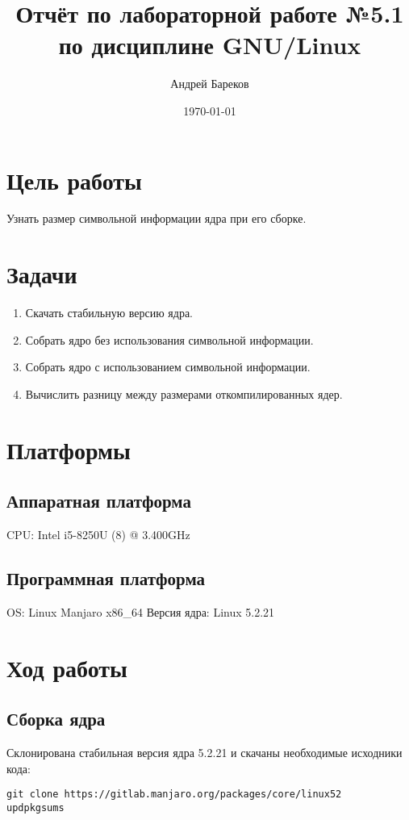 \documentclass[a4paper,11pt]{article}
\title{Отчёт по лабораторной работе №5.1 по дисциплине GNU/Linux}
\author{Андрей Бареков}
\date{\today}
\begin{document}
\maketitle
\newpage

\section{Цель работы}
  Узнать размер символьной информации ядра при его сборке.

\section{Задачи}
  \begin{enumerate}
    \item Скачать стабильную версию ядра.
    \item Собрать ядро без использования символьной информации.
    \item Собрать ядро с использованием символьной информации.
    \item Вычислить разницу между размерами откомпилированных ядер.
  \end{enumerate}

\section{Платформы}
  \subsection{Аппаратная платформа}
    CPU: Intel i5-8250U (8) @ 3.400GHz

  \subsection{Программная платформа}
    OS: Linux Manjaro x86\_64
    Версия ядра: Linux 5.2.21

\newpage
\section{Ход работы}
  \subsection{Сборка ядра}
    \lstset{style=mycode}

    Склонирована стабильная версия ядра 5.2.21 и скачаны необходимые исходники кода:
    \begin{lstlisting}
git clone https://gitlab.manjaro.org/packages/core/linux52
updpkgsums
    \end{lstlisting}
\end{document}
